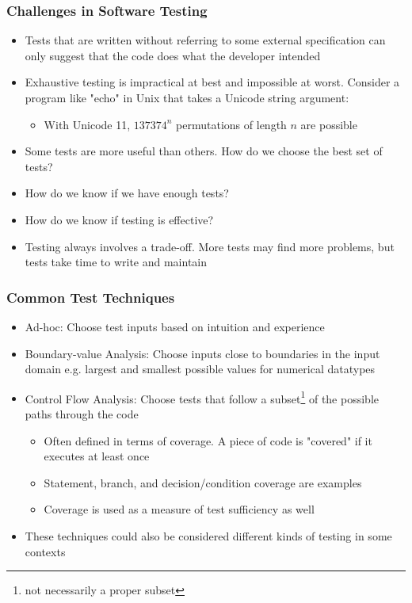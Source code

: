 \documentclass{beamer}
\begin{document}
\begin{frame}
\frametitle{Challenges in Software Testing}
\begin{itemize}
	\item Tests that are written without referring to some external specification can only suggest that the code does what the developer intended
	\item Exhaustive testing is impractical at best and impossible at worst. Consider a program like "echo" in Unix that takes a Unicode string argument:
	\begin{itemize}
		\item With Unicode 11, $137374^n$ permutations of length $n$ are possible\cite{unicodestd}
	\end{itemize}
	\item Some tests are more useful than others. How do we choose the best set of tests?
	\item How do we know if we have enough tests?
	\item How do we know if testing is effective?
	\item Testing always involves a trade-off. More tests may find more problems, but tests take time to write and maintain
\end{itemize}
\end{frame}

\begin{frame}
\frametitle{Common Test Techniques}
\begin{itemize} 
	\item Ad-hoc: Choose test inputs based on intuition and experience
	\item Boundary-value Analysis: Choose inputs close to boundaries in the input domain e.g. largest and smallest possible values for numerical datatypes
	\item Control Flow Analysis: Choose tests that follow a subset\footnote{not necessarily a proper subset} of the possible paths through the code
	\begin{itemize}
		\item Often defined in terms of coverage. A piece of code is "covered" if it executes at least once
		\item Statement, branch, and decision/condition coverage are examples 
		\item Coverage is used as a measure of test sufficiency as well
	\end{itemize}
	\item These techniques could also be considered different kinds of testing in some contexts
\end{itemize}
\end{frame}
\end{document}
